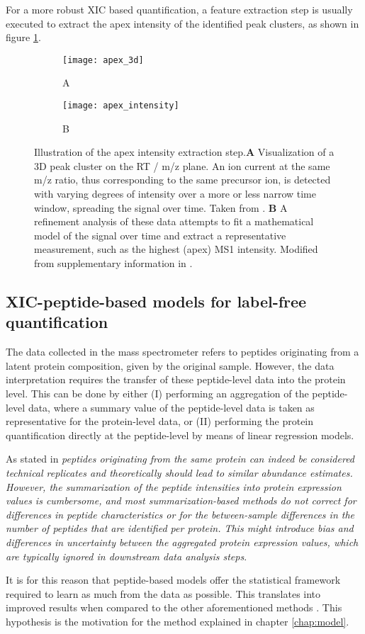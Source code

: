 For a more robust XIC based quantification, a feature extraction step is usually executed to extract the apex intensity of the identified peak clusters, as shown in figure \ref{figure:moff_apex}.

\begin{figure}[!h]
\centering
\begin{subfigure}{1\textwidth}
\centering
\caption*{A}
\texttt{[image: apex\_3d]}
\end{subfigure}
\bigskip
\begin{subfigure}{1\textwidth}
\centering
\caption*{B}
\texttt{[image: apex\_intensity]}
\end{subfigure}
\caption{Illustration of the apex intensity extraction step.\textbf{A} Visualization of a 3D peak cluster on the RT / m/z plane. An ion current at the same m/z ratio, thus corresponding to the same precursor ion, is detected with varying degrees of intensity over a more or less narrow time window, spreading the signal over time. Taken from \cite{Smith2014}. \textbf{B} A refinement analysis of these data attempts to fit a mathematical model of the signal over time and extract a representative measurement, such as the highest (apex) \ac{MS1} intensity. Modified from supplementary information in \cite{Argentini2016}.}
\label{figure:moff_apex}
\end{figure}


\subsection{\ac{XIC}-peptide-based models for label-free quantification}
\label{subsec:peptide_model}

The data collected in the mass spectrometer refers to peptides originating from a latent protein composition, given by the original sample. However, the data interpretation requires the transfer of these peptide-level data into the protein level. This can be done by either (I) performing an aggregation of the peptide-level data, where a summary value of the peptide-level data is taken as representative for the protein-level data, or (II) performing the protein quantification directly at the peptide-level by means of linear regression models.

As stated in \cite{Goeminne2015} \textit{peptides originating from the same protein can indeed be considered technical replicates and theoretically should lead to similar abundance estimates. However, the summarization of the peptide intensities into protein expression values is cumbersome, and most summarization-based methods do not correct for differences in peptide characteristics or for the between-sample differences in the number of peptides that are identified per protein. This might introduce bias and differences in uncertainty between the aggregated protein expression values, which are typically ignored in downstream data analysis steps}.

It is for this reason that peptide-based models offer the statistical framework required to learn as much from the data as possible. This translates into improved results when compared to the other aforementioned methods \cite{Goeminne2015}. This hypothesis is the motivation for the method explained in chapter \ref{chap:model}.